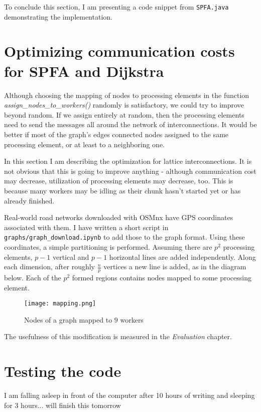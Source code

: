 \documentclass[12pt,a4paper,twoside,openright]{report}
\begin{document}
To conclude this section, I am presenting a code snippet from \texttt{SPFA.java} demonstrating the implementation.


\section{Optimizing communication costs for SPFA and Dijkstra}
Although choosing the mapping of nodes to processing elements in the function \textit{assign\_nodes\_to\_workers()} randomly is satisfactory, we could try to improve beyond random. If we assign entirely at random, then the processing elements need to send the messages all around the network of interconnections. It would be better if most of the graph's edges connected nodes assigned to the same processing element, or at least to a neighboring one.

In this section I am describing the optimization for lattice interconnections. It is not obvious that this is going to improve anything - although communication cost may decrease, utilization of processing elements may decrease, too. This is because many workers may be idling as their chunk hasn't started yet or has already finished. 

Real-world road networks downloaded with OSMnx have GPS coordinates associated with them. I have written a short script in \texttt{graphs/graph\_download.ipynb} to add those to the graph format. Using these coordinates, a simple partitioning is performed. Assuming there are $p^2$ processing elements, $p-1$ vertical and $p-1$ horizontal lines are added independently. Along each dimension, after roughly $\frac{n}{p}$ vertices a new line is added, as in the diagram below. Each of the $p^2$ formed regions contains nodes mapped to some processing element.

\begin{figure}[ht]
\centering
\texttt{[image: mapping.png]}
\caption{Nodes of a graph mapped to $9$ workers}
\end{figure}

The usefulness of this modification is measured in the \textit{Evaluation} chapter.

\section{Testing the code}
I am falling asleep in front of the computer after 10 hours of writing and sleeping for 3 hours... will finish this tomorrow
\end{document}

